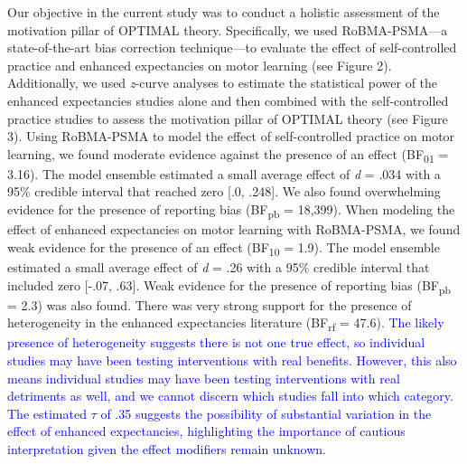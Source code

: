\documentclass[
  man, donotrepeattitle,mask,floatsintext]{apa7}
\begin{document}
Our objective in the current study was to conduct a holistic assessment of the motivation pillar of OPTIMAL theory. Specifically, we used RoBMA-PSMA---a state-of-the-art bias correction technique---to evaluate the effect of self-controlled practice and enhanced expectancies on motor learning (see Figure 2). Additionally, we used \emph{z}-curve analyses to estimate the statistical power of the enhanced expectancies studies alone and then combined with the self-controlled practice studies to assess the motivation pillar of OPTIMAL theory (see Figure 3). Using RoBMA-PSMA to model the effect of self-controlled practice on motor learning, we found moderate evidence against the presence of an effect (BF\textsubscript{01} = 3.16). The model ensemble estimated a small average effect of \emph{d} = .034 with a 95\% credible interval that reached zero {[}.0, .248{]}. We also found overwhelming evidence for the presence of reporting bias (BF\textsubscript{pb} = 18,399). When modeling the effect of enhanced expectancies on motor learning with RoBMA-PSMA, we found weak evidence for the presence of an effect (BF\textsubscript{10} = 1.9). The model ensemble estimated a small average effect of \emph{d} = .26 with a 95\% credible interval that included zero {[}-.07, .63{]}. Weak evidence for the presence of reporting bias (BF\textsubscript{pb} = 2.3) was also found. There was very strong support for the presence of heterogeneity in the enhanced expectancies literature (BF\textsubscript{rf} = 47.6). \textcolor{blue}{The likely presence of heterogeneity suggests there is not one true effect, so individual studies may have been testing interventions with real benefits. However, this also means individual studies may have been testing interventions with real detriments as well, and we cannot discern which studies fall into which category. The estimated $\tau$ of .35 suggests the possibility of substantial variation in the effect of enhanced expectancies, highlighting the importance of cautious interpretation given the effect modifiers remain unknown.}
\end{document}

